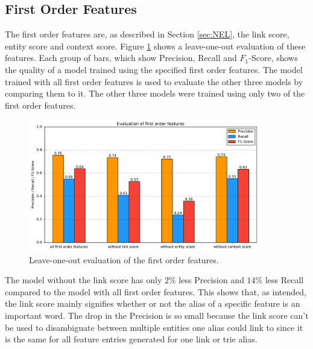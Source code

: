 \subsection{First Order Features}
The first order features are, as described in Section \ref{sec:NEL}, the link score, entity score and context score. Figure \ref{fo_eval} shows a leave-one-out evaluation of these features. Each group of bars, which show Precision, Recall and $F_1$-Score, shows the quality of a model trained using the specified first order features. The model trained with all first order features is used to evaluate the other three models by comparing them to it. The other three models were trained using only two of the first order features.\par
\begin{figure}[H]
	\centering
	\includegraphics[width=0.9\textwidth]{img/first_order_eval}
	\caption{Leave-one-out evaluation of the first order features.}
	\label{fo_eval}
\end{figure}
The model without the link score has only $2\%$ less Precision and $14\%$ less Recall compared to the model with all first order features. This shows that, as intended, the link score mainly signifies whether or not the alias of a specific feature is an important word. The drop in the Precision is so small because the link score can't be used to disambiguate between multiple entities one alias could link to since it is the same for all feature entries generated for one link or trie alias.\par

